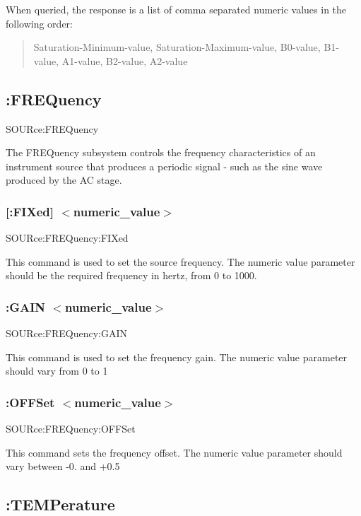 When queried, the response is a list of comma separated numeric values in the following order\-: \begin{quotation}
Saturation-\/\-Minimum-\/value, Saturation-\/\-Maximum-\/value, B0-\/value, B1-\/value, A1-\/value, B2-\/value, A2-\/value

\end{quotation}
\hypertarget{a00002_sourfreq}{}\subsection{\-:\-F\-R\-E\-Quency}\label{a00002_sourfreq}
{\ttfamily S\-O\-U\-Rce\-:F\-R\-E\-Quency}\par
 The F\-R\-E\-Quency subsystem controls the frequency characteristics of an instrument source that produces a periodic signal -\/ such as the sine wave produced by the A\-C stage.\hypertarget{a00002_sourfreqfix}{}\subsubsection{\mbox{[}\-:\-F\-I\-Xed\mbox{]} $<$numeric\-\_\-value$>$}\label{a00002_sourfreqfix}
{\ttfamily S\-O\-U\-Rce\-:\-F\-R\-E\-Quency\-:F\-I\-Xed}\par
 This command is used to set the source frequency. The numeric value parameter should be the required frequency in hertz, from 0 to 1000.\hypertarget{a00002_sourfreqgain}{}\subsubsection{\-:\-G\-A\-I\-N $<$numeric\-\_\-value$>$}\label{a00002_sourfreqgain}
{\ttfamily S\-O\-U\-Rce\-:\-F\-R\-E\-Quency\-:G\-A\-I\-N}\par
 This command is used to set the frequency gain. The numeric value parameter should vary from 0 to 1\hypertarget{a00002_sourfreqoffs}{}\subsubsection{\-:\-O\-F\-F\-Set $<$numeric\-\_\-value$>$}\label{a00002_sourfreqoffs}
{\ttfamily S\-O\-U\-Rce\-:\-F\-R\-E\-Quency\-:O\-F\-F\-Set}\par
 This command sets the frequency offset. The numeric value parameter should vary between -\/0. and +0.5\hypertarget{a00002_sourtemp}{}\subsection{\-:\-T\-E\-M\-Perature}\label{a00002_sourtemp}
